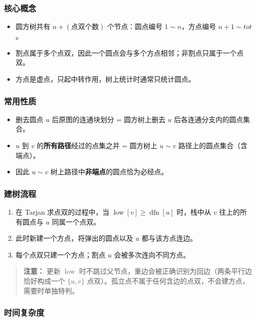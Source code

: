 \subsubsection{核心概念}

\begin{itemize}
  \item 圆方树共有 $n + (\text{点双个数})$ 个节点：圆点编号 $1 \sim n$，方点编号 $n + 1 \sim \mathit{tot}$。
  \item 割点属于多个点双，因此一个圆点会与多个方点相邻；非割点只属于一个点双。
  \item 方点是虚点，只起中转作用，树上统计时通常只统计圆点。
\end{itemize}

\subsubsection{常用性质}

\begin{itemize}
  \item 删去圆点 $u$ 后原图的连通块划分 = 圆方树上删去 $u$ 后各连通分支内的圆点集合。
  \item $u$ 到 $v$ 的\textbf{所有路径}经过的点集之并 = 圆方树上 $u \sim v$ 路径上的圆点集合（含端点）。
  \item 因此 $u \sim v$ 树上路径中\textbf{非端点}的圆点恰为必经点。
\end{itemize}

\subsubsection{建树流程}

\begin{enumerate}
  \item 在 Tarjan 求点双的过程中，当 $\operatorname{low}[v] \ge \operatorname{dfn}[u]$ 时，栈中从 $v$ 往上的所有圆点与 $u$ 同属一个点双。
  \item 此时新建一个方点，将弹出的圆点以及 $u$ 都与该方点连边。
  \item 每个点双只建一个方点；割点 $u$ 会被多次连向不同方点。
\end{enumerate}

\begin{quote}
\textbf{注意：} 更新 $\operatorname{low}$ 时不跳过父节点，重边会被正确识别为回边（两条平行边恰好构成一个 $\{u, v\}$ 点双）。孤立点不属于任何含边的点双，不会建方点，需要时单独特判。
\end{quote}

\subsubsection{时间复杂度}


